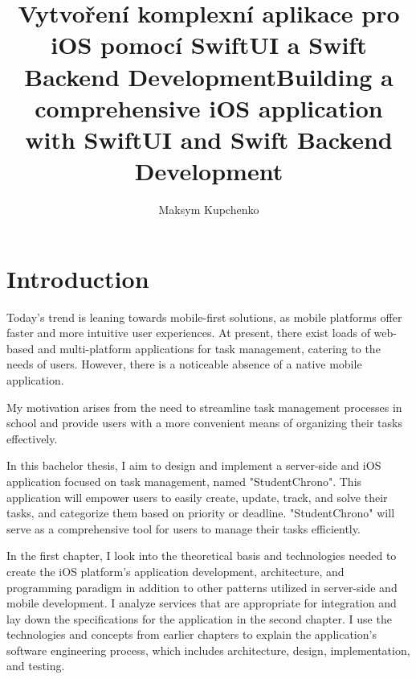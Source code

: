 \documentclass[
  biblatex,
  language=english,
  figures=false,
  sourcecodes,
  glossaries,
  index
]{kidiplom}
\title[czech]{Vytvoření komplexní aplikace pro iOS pomocí SwiftUI a Swift Backend Development}
\title[english]{Building a comprehensive iOS application with SwiftUI and Swift Backend Development}
\author{Maksym Kupchenko}
\begin{document}
\maketitle



\newcommand{\BibLaTeX}{\textsc{Bib}\LaTeX}

\section{Introduction}

Today's trend is leaning towards mobile-first solutions, as mobile platforms offer faster and more intuitive user experiences. At present, there exist loads of web-based and multi-platform applications for task management, catering to the needs of users. However, there is a noticeable absence of a native mobile application.

My motivation arises from the need to streamline task management processes in school and provide users with a more convenient means of organizing their tasks effectively.

In this bachelor thesis, I aim to design and implement a server-side and iOS application focused on task management, named "StudentChrono". This application will empower users to easily create, update, track, and solve their tasks, and categorize them based on priority or deadline. "StudentChrono" will serve as a comprehensive tool for users to manage their tasks efficiently.

In the first chapter, I look into the theoretical basis and technologies needed to create the iOS platform's application development, architecture, and programming paradigm in addition to other patterns utilized in server-side and mobile development. I analyze services that are appropriate for integration and lay down the specifications for the application in the second chapter. I use the technologies and concepts from earlier chapters to explain the application's software engineering process, which includes architecture, design, implementation, and testing.
\end{document}

